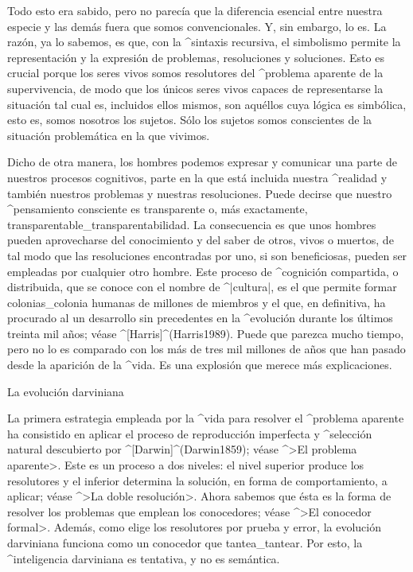 Todo esto era sabido, pero no parecía que la diferencia esencial entre
nuestra especie y las demás fuera que somos convencionales. Y, sin
embargo, lo es. La razón, ya lo sabemos, es que, con la ^{sintaxis
recursiva}, el simbolismo permite la representación y la expresión de
problemas, resoluciones y soluciones. Esto es crucial porque los seres
vivos somos resolutores del ^{problema aparente} de la supervivencia, de
modo que los únicos seres vivos capaces de representarse la situación
tal cual es, incluidos ellos mismos, son aquéllos cuya lógica es
simbólica, esto es, somos nosotros los sujetos. Sólo los sujetos somos
conscientes de la situación problemática en la que vivimos.

Dicho de otra manera, los hombres podemos expresar y comunicar una parte
de nuestros procesos cognitivos, parte en la que está incluida nuestra
^{realidad} y también nuestros problemas y nuestras resoluciones. Puede
decirse que nuestro ^{pensamiento} consciente es transparente o, más
exactamente, transparentable_{transparentabilidad}. La consecuencia es
que unos hombres pueden aprovecharse del conocimiento y del saber de
otros, vivos o muertos, de tal modo que las resoluciones encontradas por
uno, si son beneficiosas, pueden ser empleadas por cualquier otro
hombre. Este proceso de ^{cognición} compartida, o distribuida, que se
conoce con el nombre de ^|cultura|, es el que permite formar
colonias_{colonia} humanas de millones de miembros y el que, en
definitiva, ha procurado al  un desarrollo sin
precedentes en la ^{evolución} durante los últimos treinta mil años;
véase ^[Harris]^(Harris1989). Puede que parezca mucho tiempo, pero no lo
es comparado con los más de tres mil millones de años que han pasado
desde la aparición de la ^{vida}. Es una explosión que merece más
explicaciones.


\Section La evolución darviniana

La primera estrategia empleada por la ^{vida} para resolver el
^{problema aparente} ha consistido en aplicar el proceso de reproducción
imperfecta y ^{selección} natural descubierto por
^[Darwin]^(Darwin1859); véase ^>El problema aparente>. Este es un
proceso a dos niveles: el nivel superior produce los resolutores y el
inferior determina la solución, en forma de comportamiento, a aplicar;
véase ^>La doble resolución>. Ahora sabemos que ésta es la forma de
resolver los problemas que emplean los conocedores; véase ^>El conocedor
formal>. Además, como elige los resolutores por prueba y error, la
evolución darviniana funciona como un conocedor que tantea_{tantear}.
Por esto, la ^{inteligencia darviniana} es tentativa, y no es semántica.

